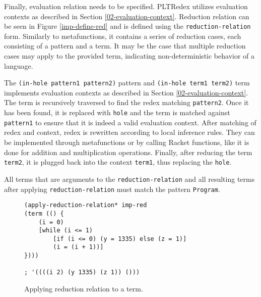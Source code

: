 Finally, evaluation relation needs to be specified. PLTRedex utilizes evaluation contexts as described in Section \ref{02-evaluation-context}. Reduction relation can be seen in Figure \ref{imp-define-red} and is defined using the \texttt{reduction-relation} form. Similarly to metafunctions, it contains a series of reduction cases, each consisting of a pattern and a term. It may be the case that multiple reduction cases may apply to the provided term, indicating non-deterministic behavior of a language.

The \texttt{(in-hole pattern1 pattern2)} pattern and \texttt{(in-hole term1 term2)} term implements evaluation contexts as described in Section \ref{02-evaluation-context}. The term is recursively traversed to find the redex matching \texttt{pattern2}. Once it has been found, it is replaced with \texttt{hole} and the term is matched against \texttt{pattern1} to ensure that it is indeed a valid evaluation context. After matching of redex and context, redex is rewritten according to local inference rules. They can be implemented through metafunctions or by calling Racket functions, like it is done for addition and multiplication operations. Finally, after reducing the term \texttt{term2}, it is plugged back into the context \texttt{term1}, thus replacing the \texttt{hole}.

All terms that are arguments to the \texttt{reduction-relation} and all resulting terms after applying \texttt{reduction-relation} must match the pattern \texttt{Program}.


\begin{figure}[H]
\begin{verbatim}
(apply-reduction-relation* imp-red 
(term (() {
	(i = 0)
	[while (i <= 1)
		[if (i <= 0) (y = 1335) else (z = 1)]
		(i = (i + 1))]
})))

; '((((i 2) (y 1335) (z 1)) ()))
\end{verbatim}
\caption{Applying reduction relation to a term.}
\label{imp-red-apply}
\end{figure}

